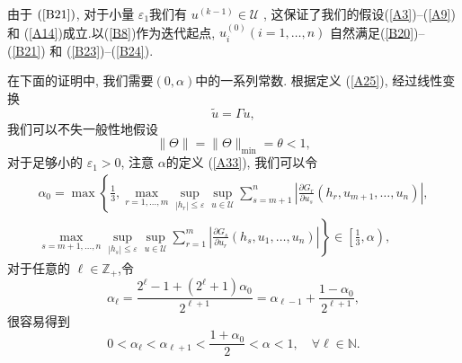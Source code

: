 \documentclass[notitlepage,cs4size,punct,oneside]{ctexrep}
\numberwithin{equation}{chapter}
\theoremstyle{mystyle}
\begin{document}
由于 $(\ref{B21})$, 对于小量 $\varepsilon_{1}$我们有 $u^{(k-1)} \in \mathcal{U}$ , 这保证了我们的假设(\ref{A3})--(\ref{A9}) 和 (\ref{A14})成立.以(\ref{B8})作为迭代起点, $u_{i}^{(0)}(i=1, \ldots, n)$ 自然满足(\ref{B20})--(\ref{B21}) 和 (\ref{B23})--(\ref{B24}).

在下面的证明中, 我们需要$(0, \alpha)$中的一系列常数. 根据定义 (\ref{A25}), 经过线性变换
\begin{equation} \label{B26}
    \tilde{u}=\Gamma u,
\end{equation}
我们可以不失一般性地假设
\begin{equation} \label{B27}
    \|\Theta\|=\|\Theta\|_{\min }=\theta<1,
\end{equation}
对于足够小的 $\varepsilon_{1}>0$, 注意 $\alpha$的定义 (\ref{A33}), 我们可以令
\begin{align}
    \alpha_{0}=\max \left\{\frac{1}{3}, \max _{r=1, \ldots, m} \sup _{\left|h_{r}\right| \leq \varepsilon} \sup _{u \in \mathcal{U}} \sum_{s=m+1}^{n}\left|\frac{\partial G_{r}}{\partial u_{s}}\left(h_{r}, u_{m+1}, \ldots, u_{n}\right)\right|\right. ,  \nonumber \\
    \left.\max _{s=m+1, \ldots, n} \sup _{\left|h_{s}\right| \leq \varepsilon} \sup _{u \in \mathcal{U}} \sum_{r=1}^{m}\left|\frac{\partial G_{s}}{\partial u_{r}}\left(h_{s}, u_{1}, \ldots, u_{n}\right)\right|\right\} \in\left[\frac{1}{3}, \alpha\right),\label{B28}
\end{align}
对于任意的 $\ell \in \mathbb{Z}_{+}$,令
\begin{equation} \label{B29}
    \alpha_{\ell}=\frac{2^{\ell}-1+\left(2^{\ell}+1\right) \alpha_{0}}{2^{\ell+1}}=\alpha_{\ell-1}+\frac{1-\alpha_{0}}{2^{\ell+1}},
\end{equation}
很容易得到
\begin{equation} \label{B30}
    0<\alpha_{\ell}<\alpha_{\ell+1}<\frac{1+\alpha_{0}}{2}<\alpha<1, \quad \forall \ell \in \mathbb{N}.
\end{equation}
\end{document}
